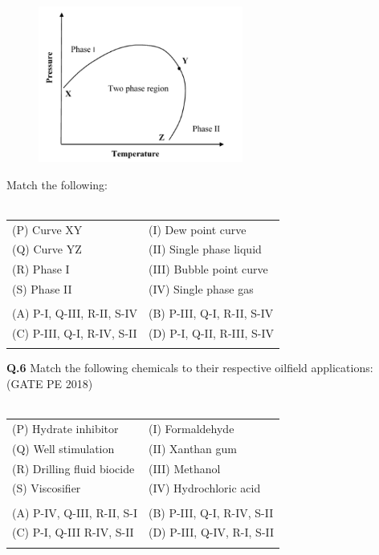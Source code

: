 \documentclass[12pt,a4paper]{article}
\begin{document}
\begin{figure}[h!]
  \centering
  \includegraphics[width=0.6\textwidth]{pic2.png} 
\end{figure}
\noindent
Match the following:\\\\
\begin{tabular}{ll}
	(P) Curve XY & (I) Dew point curve\\
	(Q) Curve YZ & (II) Single phase liquid\\
	(R) Phase I  & (III) Bubble point curve\\
	(S) Phase II &  (IV) Single phase gas\\\\
	(A) P-I, Q-III, R-II, S-IV & (B) P-III, Q-I, R-II, S-IV\\
	(C) P-III, Q-I, R-IV, S-II & (D) P-I, Q-II, R-III, S-IV\\\\
\end{tabular}


\noindent
\textbf{Q.6}\hspace{0.5em} Match the following chemicals to their respective oilfield applications:\\\hfill(GATE PE 2018)\\\\
\begin{tabular}{ll}
	(P) Hydrate inhibitor & (I) Formaldehyde\\
	(Q) Well stimulation & (II) Xanthan gum\\
	(R) Drilling fluid biocide & (III) Methanol\\
	(S) Viscosifier & (IV) Hydrochloric acid\\\\
	(A) P-IV, Q-III, R-II, S-I & (B) P-III, Q-I, R-IV, S-II\\
	(C) P-I, Q-III R-IV, S-II & (D) P-III, Q-IV, R-I, S-II \\\\
\end{tabular}
\end{document}
